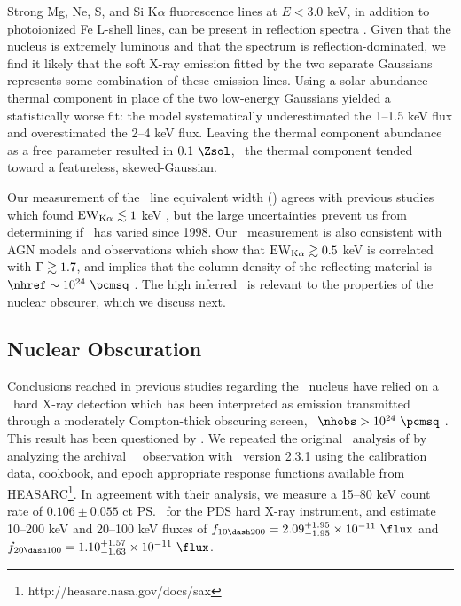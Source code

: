 \documentclass[useAMS,usenatbib]{mn2e}
\begin{document}
Strong Mg, Ne, S, and Si K$\alpha$ fluorescence lines at $E < 3.0$
keV, in addition to photoionized Fe L-shell lines, can be present in
reflection spectra \citep{1990ApJ...362...90B,
  1991MNRAS.249..352G}. Given that the nucleus is extremely luminous
and that the spectrum is reflection-dominated, we find it likely that
the soft X-ray emission fitted by the two separate Gaussians
represents some combination of these emission lines. Using a solar
abundance thermal component in place of the two low-energy Gaussians
yielded a statistically worse fit: the model systematically
underestimated the 1--1.5 keV flux and overestimated the 2--4 keV
flux. Leaving the thermal component abundance as a free parameter
resulted in $0.1 ~\Zsol$, \ie\ the thermal component tended toward a
featureless, skewed-Gaussian.

Our measurement of the \feka\ line equivalent width (\fekaew) agrees
with previous studies which found $\rm{EW}_{\rm{K}\alpha} \lesssim 1$ keV
\citep{2000A&A...353..910F, 2001MNRAS.321L..15I, 2007A&A...473...85P},
but the large uncertainties prevent us from determining if
\fekaew\ has varied since 1998. Our \fekaew\ measurement is also
consistent with AGN models and observations which show that $\rm{EW}_{\rm{K}\alpha}
\gtrsim 0.5$ keV is correlated with $\Gamma \gtrsim 1.7$, and implies that the
column density of the reflecting material is $\nhref \sim 10^{24}
~\pcmsq$ \citep{1996MNRAS.280..823M, 1997ApJ...477..602N,
  1999MNRAS.303L..11Z, 2000PASP..112.1145F, 2005A&A...444..119G}. The
high inferred \nhref\ is relevant to the properties of the nuclear
obscurer, which we discuss next.

\subsection{Nuclear Obscuration}

Conclusions reached in previous studies regarding the \irs\ nucleus
have relied on a \bepposax\ hard X-ray detection which has been
interpreted as emission transmitted through a moderately Compton-thick
obscuring screen, \ie\ $\nhobs > 10^{24} ~\pcmsq$
\citep{2000A&A...353..910F, 2001MNRAS.321L..15I}. This result has been
questioned by \citet{2007A&A...473...85P}. We repeated the original
\bepposax\ analysis of \citet{2000A&A...353..910F} by analyzing the
archival \bepposax\ \irs\ observation with \saxdas\ version 2.3.1
using the calibration data, cookbook, and epoch appropriate response
functions available from
HEASARC\footnote{http://heasarc.nasa.gov/docs/sax}. In agreement with
their analysis, we measure a 15--80 keV count rate of $0.106 \pm
0.055$ ct \ps\ for the PDS hard X-ray instrument, and estimate 10--200
keV and 20--100 keV fluxes of $f_{10 \dash 200} = 2.09^{+1.95}_{-1.95}
\times 10^{-11} ~\flux$ and $f_{20 \dash 100} = 1.10^{+1.57}_{-1.63}
\times 10^{-11} ~\flux$.
\end{document}
